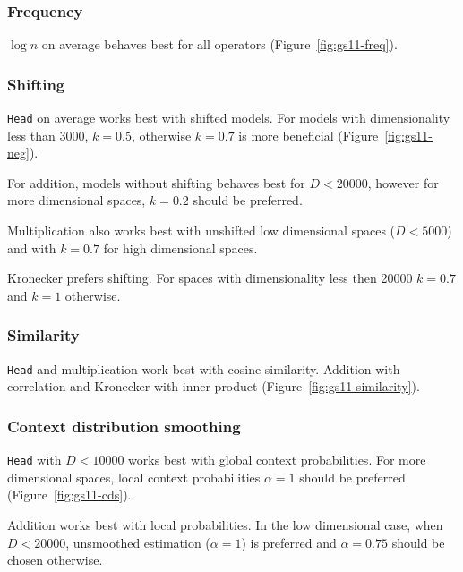

\subsubsection{Frequency}



$\log n$ on average behaves best for all operators (Figure~\ref{fig:gs11-freq}).

\subsubsection{Shifting}

\texttt{Head} on average works best with shifted models. For models with dimensionality less than 3000, $k = 0.5$, otherwise $k = 0.7$ is more beneficial (Figure~\ref{fig:gs11-neg}).

For addition, models without shifting behaves best for $D < 20000$, however for more dimensional spaces, $k = 0.2$ should be preferred.

Multiplication also works best with unshifted low dimensional spaces ($D < 5000$) and with $k = 0.7$ for high dimensional spaces.

Kronecker prefers shifting. For spaces with dimensionality less then 20000 $k = 0.7$ and $k = 1$ otherwise.

\subsubsection{Similarity}



\texttt{Head} and multiplication work best with cosine similarity. Addition with correlation and Kronecker with inner product (Figure~\ref{fig:gs11-similarity}).

\subsubsection{Context distribution smoothing}

\texttt{Head} with $D < 10000$ works best with global context probabilities. For more dimensional spaces, local context probabilities $\alpha = 1$ should be preferred (Figure~\ref{fig:gs11-cds}).

Addition works best with local probabilities. In the low dimensional case, when $D < 20000$, unsmoothed estimation ($\alpha = 1$) is preferred and $\alpha = 0.75$ should be chosen otherwise.

